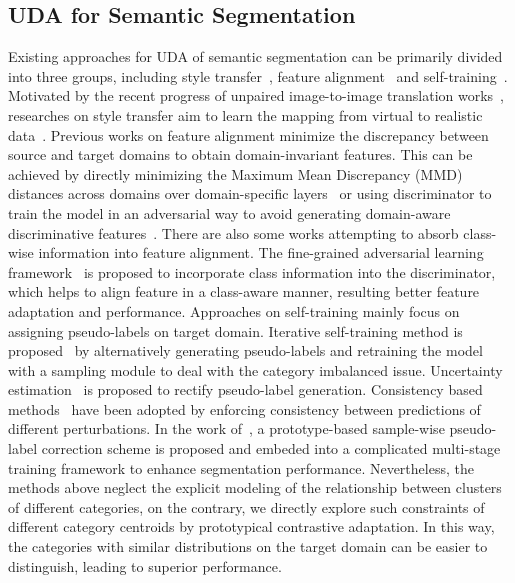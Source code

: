 \documentclass[runningheads]{llncs}
\begin{document}
\subsection{UDA for Semantic Segmentation}
Existing approaches for UDA of semantic segmentation can be primarily divided into three groups, including style transfer~\cite{murez2018image}, feature alignment~\cite{hoffman2018cycada,hoffman2016fcns,gu2021pit,zhou2021self} and self-training~\cite{zou2018unsupervised,araslanov2021self}. Motivated by the recent progress of unpaired image-to-image translation works~\cite{zhu2017unpaired}, researches on style transfer aim to learn the mapping from virtual to realistic data~\cite{murez2018image,hoffman2018cycada}. Previous works on feature alignment minimize the discrepancy between source and target domains to obtain domain-invariant features. This can be achieved by directly minimizing the Maximum Mean Discrepancy (MMD) distances across domains over domain-specific layers~\cite{long2015learning} or using discriminator to train the model in an adversarial way to avoid generating domain-aware discriminative features~\cite{hoffman2016fcns}. There are also some works attempting to absorb class-wise information into feature alignment. The fine-grained adversarial learning framework~\cite{wang2020classes} is proposed to incorporate class information into the discriminator, which helps to align feature in a class-aware manner, resulting better feature adaptation and performance. Approaches on self-training mainly focus on assigning pseudo-labels on target domain. Iterative self-training method is proposed~\cite{zou2018unsupervised} by alternatively generating pseudo-labels and retraining the model with a sampling module to deal with the category imbalanced issue. Uncertainty estimation~\cite{zheng2021rectifying} is proposed to rectify pseudo-label generation. Consistency based methods~\cite{araslanov2021self} have been adopted by enforcing consistency between predictions of different perturbations. In the work of~\cite{zhang2021prototypical}, a prototype-based sample-wise pseudo-label correction scheme is proposed and embeded into a complicated multi-stage training framework to enhance segmentation performance. Nevertheless, the methods above neglect the explicit modeling of the relationship between clusters of different categories, on the contrary, we directly explore such constraints of different category centroids by prototypical contrastive adaptation. In this way, the categories with similar distributions on the target domain can be easier to distinguish, leading to superior performance.
\end{document}
